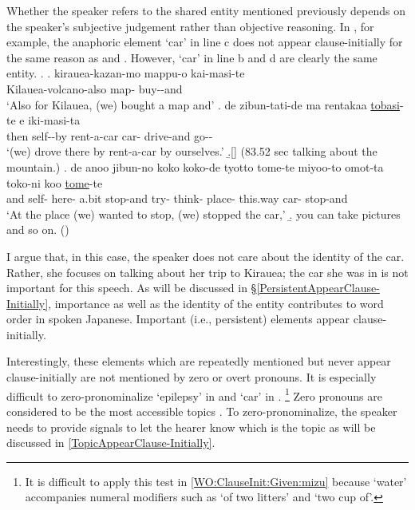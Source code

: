 Whether the speaker refers to the shared entity mentioned previously
depends on the speaker's subjective judgement rather than objective reasoning.
In \Next, for example,
the anaphoric element  `car' in line c does not appear clause-initially for the same reason as \LLast and \Last.
However,  `car' in line b and d are clearly the same entity.
%
\ex.\label{WO:ClauseInit:Given:kuruma}
 \ag. kirauea-kazan-mo mappu-o kai-masi-te \\
 		Kilauea-volcano-also map- buy--and \\
		`Also for Kilauea, (we) bought a map and'
 \bg. de zibun-tati-de ma rentakaa  \ul{tobasi}-te e iki-masi-ta \\
 		then self--by  rent-a-car car- drive-and  go-- \\
		`(we) drove there by rent-a-car by ourselves.'
 \b.[] (83.52 sec talking about the mountain.)
 \bg. de anoo jibun-no koko koko-de tyotto tome-te miyoo-to omot-ta toko-ni koo  \ul{tome}-te \\
 		and  self-  here- a.bit stop-and try- think- place- this.way car- stop-and \\
	 	`At the place (we) wanted to stop, (we) stopped the car,'
 \b. you can take pictures and so on.
 \hfill{()}
%

I argue that, in this case, the speaker does not care about the identity of the car.
Rather, she focuses on talking about her trip to Kirauea;
the car she was in is not important for this speech.
As will be discussed in \S \ref{PersistentAppearClause-Initially},
importance as well as the identity of the entity contributes to word order in spoken Japanese.
Important (i.e., persistent) elements appear clause-initially.

Interestingly,
these elements which are repeatedly mentioned but never appear clause-initially are not mentioned by zero or overt pronouns.
It is especially difficult to zero-pronominalize  `epilepsy' in \LLast[b-f] and  `car' in \Last[d].%
 \footnote{
 It is difficult to apply this test in \ref{WO:ClauseInit:Given:mizu} because  `water' accompanies numeral modifiers such as 
 `of two litters' and `two cup of'.
 }
Zero pronouns are considered to be the most accessible topics \cite[17]{givon83}.
To zero-pronominalize,
the speaker needs to provide signals to let the hearer know which is the topic as will be discussed in \ref{TopicAppearClause-Initially}.

